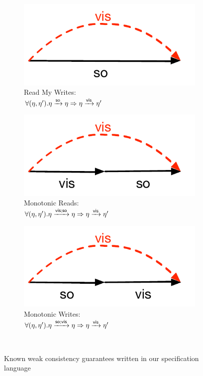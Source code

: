 \begin{figure}[t]
        \centering
	\begin{subfigure}[b]{0.3\textwidth}
	\caption{Read My Writes: \\
	$\forall(\eta,\eta'). \eta \xrightarrow{{\normalfont \textsf{so}}} \eta \Rightarrow
	\eta \xrightarrow{{\normalfont \textsf{vis}}} \eta'$}
	\includegraphics[scale=0.5]{Figures/rmw.pdf}
	\end{subfigure}
	\vrule
	\hfill
	\begin{subfigure}[b]{0.3\textwidth}
	\caption{Monotonic Reads: 
	\\	$\forall(\eta,\eta'). \eta \xrightarrow{{\normalfont \textsf{vis}};{\normalfont \textsf{so}}} \eta \Rightarrow
	\eta \xrightarrow{{\normalfont \textsf{vis}}} \eta' $}
	\includegraphics[scale=0.5]{Figures/mr.pdf}
	\end{subfigure}
	\vrule
	\hfill
	\begin{subfigure}[b]{0.25\textwidth}
	\caption{Monotonic Writes:
	\\	$\forall(\eta,\eta'). \eta \xrightarrow{{\normalfont \textsf{so}};{\normalfont \textsf{vis}}} \eta \Rightarrow
	\eta \xrightarrow{{\normalfont \textsf{vis}}} \eta' $}
	\includegraphics[scale=0.5]{Figures/mw.pdf}
	\end{subfigure}
\\ \hrulefill

\caption{Known weak consistency guarantees written in our specification
language}
\label{fig:ctrt_rep}
\end{figure}


